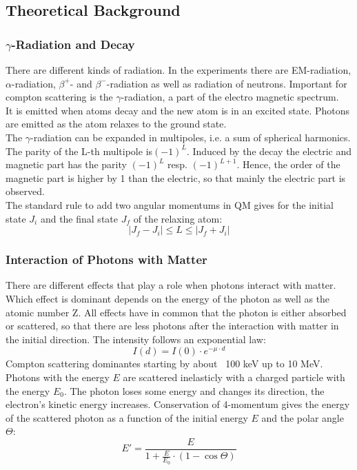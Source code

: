 \subsection{Theoretical Background}
\subsubsection{$\gamma$-Radiation and Decay}
There are different kinds of radiation. In the experiments there are EM-radiation, $\alpha$-radiation, $\beta^{+}$- and $\beta^{-}$-radiation as well as radiation of neutrons. Important for compton scattering is the  $\gamma$-radiation, a part of the electro magnetic spectrum.\\
It is emitted when atoms decay and the new atom is in an excited state. Photons are emitted as the atom relaxes to the ground state.\\
The $\gamma$-radiation can be expanded in multipoles, i.e. a sum of spherical harmonics. The parity of the L-th multipole is$(-1)^{L}$. Induced by the decay the electric and magnetic part has the parity $(-1)^{L}$ resp. $(-1)^{L+1}$. Hence, the order of the magnetic part is higher by 1 than the electric, so that mainly the electric part is observed. \\
The standard rule to add two angular momentums in QM gives for the initial state $J_i$ and the final state $J_f$ of the relaxing atom:
$$\vert J_f - J_i \vert \leq L \leq \vert J_f + J_i \vert $$ 

\subsubsection{Interaction of Photons with Matter}
There are different effects that play a role when photons interact with matter. Which effect is dominant depends on the energy of the photon as well as the atomic number Z. All effects have in common that the photon is either absorbed or scattered, so that there are less photons after the interaction with matter in the initial direction. The intensity follows an exponential law:
$$I(d) = I(0) \cdot e^{-\mu \cdot d} $$
Compton scattering dominantes starting by about ~100 keV up to 10 MeV. \\
Photons with the energy $E$ are scattered inelasticly with a charged particle with the energy $E_0$. The photon loses some energy and changes its direction, the electron's kinetic energy increases. Conservation of 4-momentum gives the energy of the scattered photon as a function of the initial energy $E$ and the polar angle $\Theta$:
$$E' = \frac{E}{1 + \frac{E}{E_0} \cdot (1 - \cos \Theta)}$$

